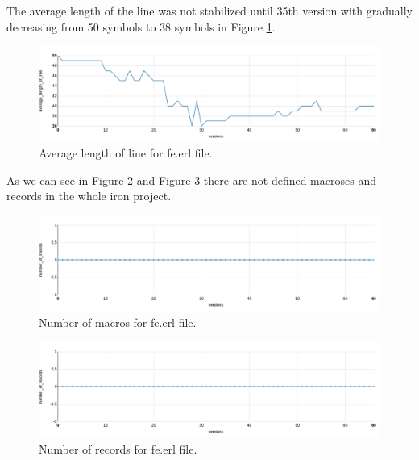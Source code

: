 The average length of the line was not stabilized until 35th version with gradually decreasing from 50 symbols to 38 symbols in Figure \ref{fig:average_length_of_line_iron}.

\begin{figure}[ht]
	\centering
	\includegraphics[width=\textwidth]{figures/average_length_of_line_iron.png}
	\caption{Average length of line for fe.erl file.}
	\label{fig:average_length_of_line_iron}
\end{figure}

As we can see in Figure \ref{fig:number_of_macros_iron} and Figure \ref{fig:number_of_records_iron} there are not defined macroses and records in the whole iron project.

\begin{figure}[ht]
	\centering
	\includegraphics[width=\textwidth]{figures/number_of_macros_iron.png}
	\caption{Number of macros for fe.erl file.}
	\label{fig:number_of_macros_iron}
\end{figure}

\begin{figure}[ht]
	\centering
	\includegraphics[width=\textwidth]{figures/number_of_records_iron.png}
	\caption{Number of records for fe.erl file.}
	\label{fig:number_of_records_iron}
\end{figure}

